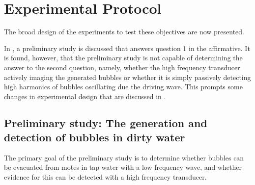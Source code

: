 \section{Experimental Protocol}\label{sec:exp:protocol}

The broad design of the experiments to test these objectives are now presented.

In , a preliminary study is discussed that 
answers question 1 in the affirmative.
It is found, however, that the preliminary study is not capable of determining the answer to 
the second question, namely,
whether the high frequency transducer actively imaging the generated bubbles
or whether it is simply passively detecting high harmonics
of bubbles oscillating due the driving wave.
This prompts some changes in experimental design that are discussed in .


\subsection{Preliminary study: The generation and detection of bubbles in dirty water}\label{sec:exp:prelim}

The primary goal of the preliminary study is  to determine whether bubbles can be evacuated from motes in tap 
water with a low frequency wave, 
and whether evidence for this can be detected with a high frequency transducer.

